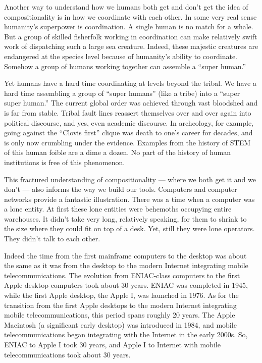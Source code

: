 Another way to understand how we humans both get and don't get the idea of compositionality is in how we coordinate with each other. In some very real sense humanity's superpower is coordination. A single human is no match for a whale. But a group of skilled fisherfolk working in coordination can make relatively swift work of dispatching such a large sea creature. Indeed, these majestic creatures are endangered at the species level because of humanity's ability to coordinate. Somehow a group of humans working together can assemble a ``super human.''

Yet humans have a hard time coordinating at levels beyond the tribal. We have a hard time assembling a group of ``super humans'' (like a tribe) into a ``super super human.'' The current global order was achieved through vast bloodshed and is far from stable. Tribal fault lines reassert themselves over and over again into political  discourse, and yes, even academic discourse. In archeology, for example, going against the ``Clovis first'' clique was death to one's career for decades, and is only now crumbling under the evidence. Examples from the history of STEM of this human foible are a dime a dozen. No part of the history of human institutions is free of this phenomenon.

This fractured understanding of compositionality --- where we both get it and we don't --- also informs the way we build our tools. Computers and computer networks provide a fantastic illustration. There was a time when a computer was a lone entity. At first these lone entities were behemoths occupying entire warehouses. It didn't take very long, relatively speaking, for them to shrink to the size where they could fit on top of a desk. Yet, still they were lone operators. They didn't talk to each other.

Indeed the time from the first mainframe computers to the desktop was about the same as it was from the desktop to the modern Internet integrating mobile telecommunications. The evolution from ENIAC-class computers to the first Apple desktop computers took about 30 years. ENIAC was completed in 1945, while the first Apple desktop, the Apple I, was launched in 1976. As for the transition from the first Apple desktops to the modern Internet integrating mobile telecommunications, this period spans roughly 20 years. The Apple Macintosh (a significant early desktop) was introduced in 1984, and mobile telecommunications began integrating with the Internet in the early 2000s. So, ENIAC to Apple I took 30 years, and Apple I to Internet with mobile telecommunications took about 30 years. 

